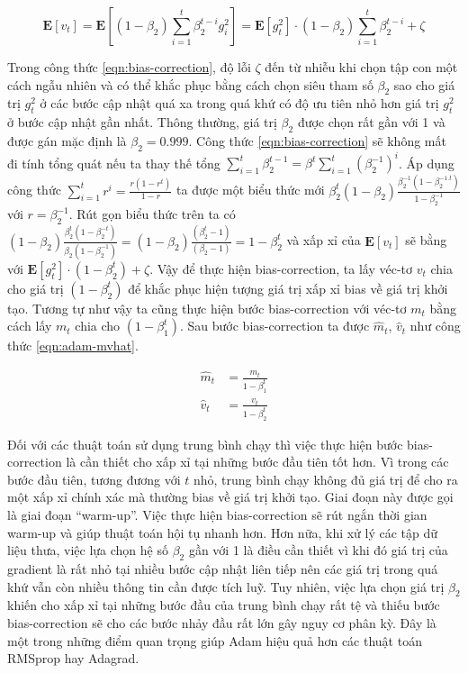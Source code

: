 \begin{equation}
	\label{eqn:bias-correction}
	\mathbf{E}[v_t] = \mathbf{E}[(1-\beta_2)\sum_{i=1}^t\beta_2^{t-i}g_i^2] = \mathbf{E}[g_t^2]\cdot(1-\beta_2)\sum_{i=1}^t\beta_2^{t-i}+\zeta
\end{equation}

Trong công thức \ref{eqn:bias-correction}, độ lỗi $\zeta$ đến từ nhiễu khi chọn tập con một cách ngẫu nhiên và có thể khắc phục bằng cách chọn siêu tham số $\beta_2$ sao cho giá trị $g_t^2$ ở các bước cập nhật quá xa trong quá khứ có độ ưu tiên nhỏ hơn giá trị $g_t^2$ ở bước cập nhật gần nhất. Thông thường, giá trị $\beta_2$ được chọn rất gần với 1 và được gán mặc định là $\beta_2 = 0.999$. Công thức \ref{eqn:bias-correction} sẽ không mất đi tính tổng quát nếu ta thay thế tổng $\sum_{i=1}^t\beta_2^{t-1} = \beta^t \sum_{i=1}^t(\beta_2^{-1})^i$. Áp dụng công thức $\sum_{i=1}^t r^i = \frac{r(1 - r^t)}{1-r}$ ta được một biểu thức mới $\beta_2^t (1-\beta_2)\frac{\beta_2^{-1}(1 - \beta_2^{-1.t})}{1 - \beta_2^{-1}}$ với $r = \beta_2^{-1}$. Rút gọn biểu thức trên ta có $(1-\beta_2)\frac{\beta_2^{t}(1 - \beta_2^{-t})}{\beta_2(1 - \beta_2^{-1})} = (1-\beta_2)\frac{(\beta_2^{t} - 1)}{(\beta_2 - 1)} = 1 - \beta_2^t$ và xấp xỉ của $\mathbf{E}[v_t]$ sẽ bằng với $\mathbf{E}[g_t^2]\cdot (1-\beta_2^t) + \zeta$. Vậy để thực hiện bias-correction, ta lấy véc-tơ $v_t$ chia cho giá trị $(1 - \beta_2^t)$ để khắc phục hiện tượng giá trị xấp xỉ bias về giá trị khởi tạo. Tương tự như vậy ta cũng thực hiện bước bias-correction với véc-tơ $m_t$ bằng cách lấy $m_t$ chia cho $(1-\beta_1^t)$. Sau bước bias-correction ta được $\hat m_t$, $\hat v_t$ như công thức \ref{eqn:adam-mvhat}.

\begin{equation}
	\label{eqn:adam-mvhat}
	\begin{aligned}
		\hat m_t &= \frac{m_t}{1-\beta_1^t} \\
		\hat v_t &= \frac{v_t}{1-\beta_2^t}
	\end{aligned}
\end{equation}

Đối với các thuật toán sử dụng trung bình chạy thì việc thực hiện bước bias-correction là cần thiết cho xấp xỉ tại những bước đầu tiên tốt hơn. Vì trong các bước đầu tiên, tương đương với $t$ nhỏ, trung bình chạy không đủ giá trị để cho ra một xấp xỉ chính xác mà thường bias về giá trị khởi tạo. Giai đoạn này được gọi là giai đoạn ``warm-up''. Việc thực hiện bias-correction sẽ rút ngắn thời gian warm-up và giúp thuật toán hội tụ nhanh hơn. Hơn nữa, khi xử lý các tập dữ liệu thưa, việc lựa chọn hệ số $\beta_2$ gần với 1 là điều cần thiết vì khi đó giá trị của gradient là rất nhỏ tại nhiều bước cập nhật liên tiếp nên các giá trị trong quá khứ vẫn còn nhiều thông tin cần được tích luỹ. Tuy nhiên, việc lựa chọn giá trị $\beta_2$ khiến cho xấp xỉ tại những bước đầu của trung bình chạy rất tệ và thiếu bước bias-correction sẽ cho các bước nhảy đầu rất lớn gây nguy cơ phân kỳ. Đây là một trong những điểm quan trọng giúp Adam hiệu quả hơn các thuật toán RMSprop hay Adagrad.

